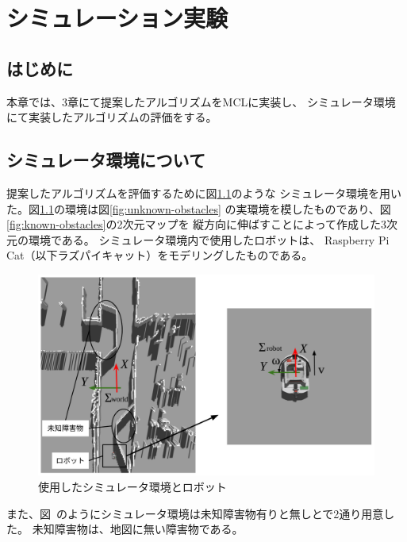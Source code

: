 \chapter{シミュレーション実験}\label{chap:simulation_experiment}

\section{はじめに}
本章では、3章にて提案したアルゴリズムをMCLに実装し、
シミュレータ環境にて実装したアルゴリズムの評価をする。

\section{シミュレータ環境について}

提案したアルゴリズムを評価するために図\ref{fig:sim_world}のような
シミュレータ環境を用いた。図\ref{fig:sim_world}の環境は図\ref{fig:unknown-obstacles}
の実環境を模したものであり、図\ref{fig:known-obstacles}の2次元マップを
縦方向に伸ばすことによって作成した3次元の環境である。
シミュレータ環境内で使用したロボットは、
Raspberry Pi Cat（以下ラズパイキャット）をモデリングしたものである。

\begin{figure}[h]
  \begin{center}
    \includegraphics[width=0.98\linewidth]{figs/sim_world.png}
    \caption{使用したシミュレータ環境とロボット}
    \label{fig:sim_world}
  \end{center}
\end{figure}

\newpage

また、図~のようにシミュレータ環境は未知障害物有りと無しとで2通り用意した。
未知障害物は、地図に無い障害物である。

